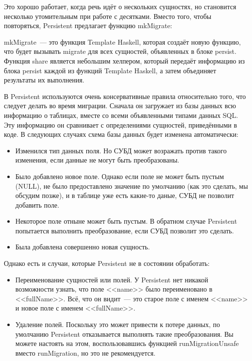 Это хорошо работает, когда речь идёт о нескольких сущностях, но становится несколько утомительным при работе с десятками. Вместо того, чтобы повторяться, Persistent предлагает функцию mkMigrate:


mkMigrate~--- это функция Template Haskell, которая создаёт новую функцию, что будет вызывать migrate для всех сущностей, объявленных в блоке persist. Функция share является небольшим хелпером, который передаёт информацию из блока persist каждой из функций Template Haskell, а затем объединяет результаты их выполнения.

В Persistent используются очень консервативные правила относительно того, что следует делать во время миграции. Сначала он загружает из базы данных всю информацию о таблицах, вместе со всеми объявленными типами данных SQL. Эту информацию он сравнивает с определениями сущностей, приведёнными в коде. В следующих случаях схема базы данных будет изменена автоматически:

\begin{itemize}
	\item Изменился тип данных поля. Но СУБД может возражать против такого изменения, если данные не могут быть преобразованы.
	\item Было добавлено новое поле. Однако если поле не может быть пустым (NULL), не было предоставлено значение по умолчанию (как это сделать, мы обсудим позже), и в таблице уже есть какие-то даные, СУБД не позволит добавить поле.
	\item Некоторое поле отныне может быть пустым. В обратном случае Persistent попытается выполнить преобразование, если СУБД позволит это сделать.
	\item Была добавлена совершенно новая сущность.
\end{itemize}

Однако есть и случаи, которые Persistent не в состоянии обработать:

\begin{itemize}
	\item Переименование сущностей или полей. У Persistent нет никакой возможности узнать, что поле <<name>> было переименовано в <<fullName>>. Всё, что он видит~--- это старое поле с именем <<name>> и новое поле с именем <<fullName>>.
	\item Удаление полей. Поскольку это может привести к потере данных, по умолчанию Persistent отказывается выполнять такие преобразования. Вы можете настоять на этом, воспользовавшись функцией runMigrationUnsafe вместо runMigration, но это не рекомендуется.
\end{itemize}

